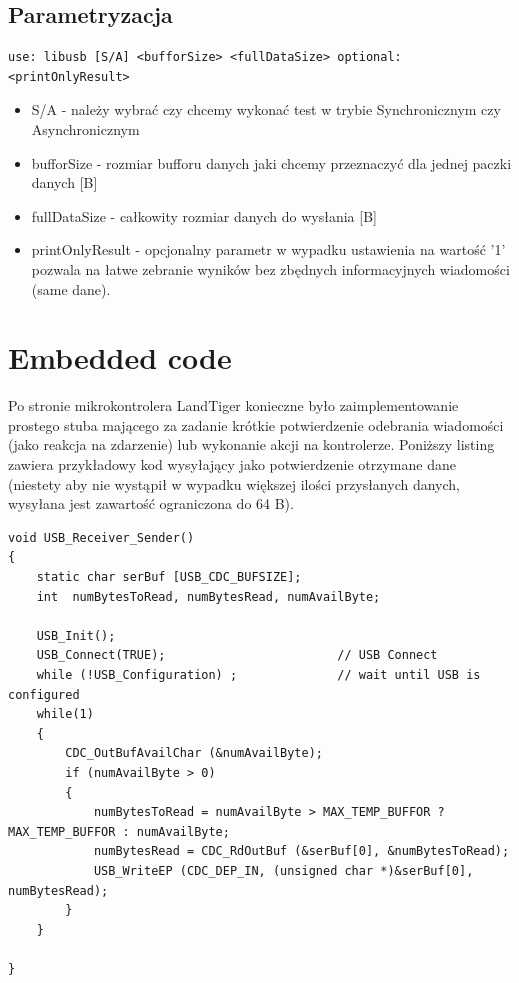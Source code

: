 \documentclass{BscUS}
\begin{document}
\subsection{Parametryzacja}
\begin{lstlisting}[caption={uruchomienie testu}]
use: libusb [S/A] <bufforSize> <fullDataSize> optional:<printOnlyResult>
\end{lstlisting}
\begin{itemize}
\item S/A - należy wybrać czy chcemy wykonać test w trybie Synchronicznym czy Asynchronicznym
\item bufforSize - rozmiar bufforu danych jaki chcemy przeznaczyć dla jednej paczki danych [B]
\item fullDataSize - całkowity rozmiar danych do wysłania [B]
\item printOnlyResult - opcjonalny parametr w wypadku ustawienia na wartość '1' pozwala na łatwe zebranie wyników bez zbędnych informacyjnych wiadomości (same dane). 
\end{itemize}
\section{Embedded code}
Po stronie mikrokontrolera LandTiger konieczne było zaimplementowanie prostego stuba mającego za zadanie krótkie potwierdzenie odebrania wiadomości (jako reakcja na zdarzenie) lub wykonanie akcji na kontrolerze. Poniższy listing zawiera przykładowy kod wysyłający jako potwierdzenie otrzymane dane (niestety aby nie wystąpił w wypadku większej ilości przysłanych danych, wysyłana jest zawartość ograniczona do 64 B). \cite{embeddedC, embeddedSystems, bootstrapLinUSB}
\begin{lstlisting}[caption={Funkcja USB\_Receiver\_Sender},label={lst:FUSBSenderReceiver}]
void USB_Receiver_Sender()
{
	static char serBuf [USB_CDC_BUFSIZE];
	int  numBytesToRead, numBytesRead, numAvailByte;

	USB_Init();
	USB_Connect(TRUE);                        // USB Connect
	while (!USB_Configuration) ;              // wait until USB is configured
	while(1)
	{
		CDC_OutBufAvailChar (&numAvailByte);
		if (numAvailByte > 0)
		{
		  	numBytesToRead = numAvailByte > MAX_TEMP_BUFFOR ? MAX_TEMP_BUFFOR : numAvailByte;
		    numBytesRead = CDC_RdOutBuf (&serBuf[0], &numBytesToRead);
		    USB_WriteEP (CDC_DEP_IN, (unsigned char *)&serBuf[0], numBytesRead);
		}
	}

}
\end{lstlisting}
\end{document}
